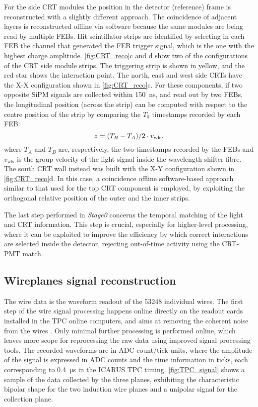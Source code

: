 For the side CRT modules the position in the detector (reference) frame is reconstructed with a slightly different approach. The coincidence of adjacent layers is reconstructed offline via software because the same modules are being read by multiple FEBs. Hit scintillator strips are identified by selecting in each FEB the channel that generated the FEB trigger signal, which is the one with the highest charge amplitude. \autoref{fig:CRT_reco}c and d show two of the configurations of the CRT side module strips. The triggering strip is shown in yellow, and the red star shows the interaction point. The north, east and west side CRTs have the X-X configuration shown in \autoref{fig:CRT_reco}c. For these components, if two opposite SiPM signals are collected within \SI{150}{\ns}, and read out by two FEBs, the longitudinal position (across the strip) can be computed with respect to the centre position of the strip by comparing the $T_0$ timestamps recorded by each FEB:     \begin{equation}
    z = \qty(T_B - T_A)/2 \cdot v_\mathrm{wls}, 
\end{equation} where $T_A$ and $T_B$ are, respectively, the two timestamps recorded by the FEBs  and $v_\mathrm{wls}$ is the group velocity of the light signal inside the wavelength shifter fibre. The south CRT wall instead was built with the X-Y configuration shown in \autoref{fig:CRT_reco}d. In this case, a coincidence offline software-based approach similar to that used for the top CRT component is employed, by exploiting the orthogonal relative position of the outer and the inner strips. 

The last step performed in \emph{Stage0} concerns the temporal matching of the light and CRT information. This step is crucial, especially for higher-level processing, where it can be exploited to improve the efficiency by which correct interactions are selected inside the detector, rejecting out-of-time activity using the CRT-PMT match. 

\subsection{Wireplanes signal reconstruction}

The wire data is the waveform readout of the \num{53248} individual wires. The first step of the wire signal processing happens online directly on the readout cards installed in the TPC online computers, and aims at removing the coherent noise from the wires \cite{MicroBooNE:2017qiu}. Only minimal further processing is performed online, which leaves more scope for reprocessing the raw data using improved signal processing tools. The recorded waveforms are in ADC count/tick units, where the amplitude of the signal is expressed in ADC counts and the time information in ticks, each corresponding to \SI{0.4}{\us} in the ICARUS TPC timing. \autoref{fig:TPC_signal} shows a sample of the data collected by the three planes, exhibiting the characteristic bipolar shape for the two induction wire planes and a unipolar signal for the collection plane. 

